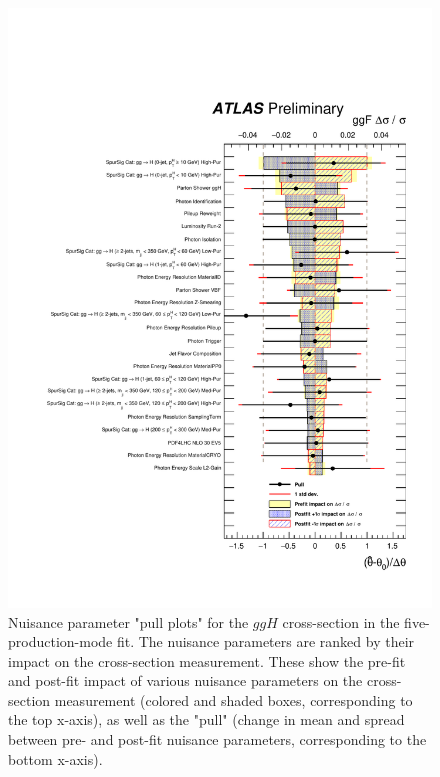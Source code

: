 \begin{figure}[htbp]
  \centering
  \includegraphics[width=0.9\linewidth]{figures/couplings_chapter/pulls_mu_ggF}
  \caption{Nuisance parameter "pull plots" for the $ggH$ cross-section in the five-production-mode fit. The nuisance parameters are ranked by their impact on the cross-section measurement. These show the pre-fit and post-fit impact of various nuisance parameters on the cross-section measurement (colored and shaded boxes, corresponding to the top x-axis), as well as the "pull" (change in mean and spread between pre- and post-fit nuisance parameters, corresponding to the bottom x-axis).}
  \label{fig:ranking_ggF}
\end{figure}

